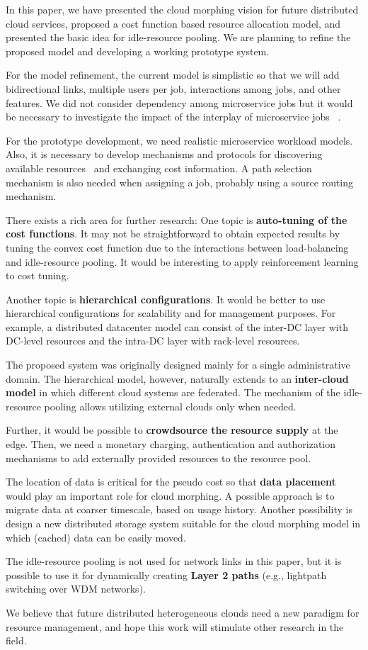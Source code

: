 
In this paper, we have presented the cloud morphing vision for
future distributed cloud services,
proposed a cost function based resource allocation model,
and presented the basic idea for idle-resource pooling.
We are planning to refine the proposed model and developing a working
prototype system.

For the model refinement,
the current model is simplistic so that we will add bidirectional links,
multiple users per job, interactions among jobs, and other features.
We did not consider dependency among microservice jobs but it would be
necessary to investigate the impact of the interplay of microservice
jobs ~\cite{Suresh-SOA-SOCC2017}.

For the prototype development,
we need realistic microservice workload models.
Also, it is necessary to develop mechanisms and protocols for
discovering available resources~\cite{Albrecht2008} and exchanging
cost information.
A path selection mechanism is also needed when assigning a job,
probably using a source routing mechanism.

There exists a rich area for further research:
One topic is {\bf auto-tuning of the cost functions}.
It may not be straightforward to obtain expected results by tuning the
convex cost function due to the interactions between load-balancing
and idle-resource pooling.
It would be interesting to apply reinforcement learning to cost
tuning.

Another topic is {\bf hierarchical configurations}.
It would be better to use hierarchical configurations for scalability
and for management purposes.
For example, a distributed datacenter model can consist of
the inter-DC layer with DC-level resources and the intra-DC layer
with rack-level resources.

The proposed system was originally designed mainly for a single
administrative domain.
The hierarchical model, however, naturally extends to
an {\bf inter-cloud model} in which different cloud systems are
federated.
The mechanism of the idle-resource pooling allows utilizing external
clouds only when needed.

Further, it would be possible to {\bf crowdsource the resource supply}
at the edge. 
Then, we need a monetary charging, authentication and authorization
mechanisms to add externally provided resources to the resource pool.

The location of data is critical for the pseudo cost so that
{\bf data placement} would play an important role for cloud morphing. 
A possible approach is to migrate data at coarser timescale, based
on usage history.
Another possibility is design a new distributed storage system
suitable for the cloud morphing model in which (cached) data can be
easily moved.

The idle-resource pooling is not used for network links in this paper, but
it is possible to use it for dynamically creating {\bf Layer 2 paths}
(e.g., lightpath switching over WDM networks).

We believe that future distributed heterogeneous clouds need a new
paradigm for resource management, and hope this work will stimulate
other research in the field.
